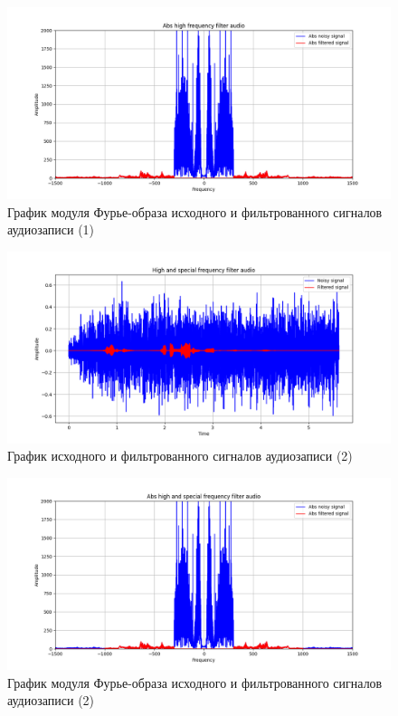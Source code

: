 \documentclass[a4paper, 12pt]{article}
\begin{document}
    \begin{figure}[!htb]
        \centering
        \includegraphics[scale=0.48]{abs_u_U_audio.png}
        \captionsetup{skip=0pt}
        \caption{График модуля Фурье-образа исходного и фильтрованного сигналов аудиозаписи (1)}
        \label{fig:fig114}
    \end{figure}
    \begin{figure}[!htb]
        \centering
        \includegraphics[scale=0.48]{u_flt_u_audio_v2.png}
        \captionsetup{skip=0pt}
        \caption{График исходного и фильтрованного сигналов аудиозаписи (2)}
        \label{fig:fig115}
    \end{figure}
    \begin{figure}[H]
        \centering
        \includegraphics[scale=0.48]{abs_u_U_audio_v2.png}
        \captionsetup{skip=0pt}
        \caption{График модуля Фурье-образа исходного и фильтрованного сигналов аудиозаписи (2)}
        \label{fig:fig116}
    \end{figure}
\end{document}
